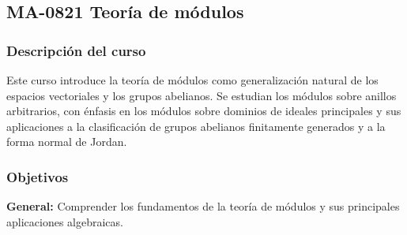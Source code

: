 \newpage
\subsection*{MA-0821 Teoría de módulos}

\hypertarget{MA0821}{}
\begin{refsection}
\begin{table}[H]
\end{table}

\subsubsection*{Descripción del curso}
Este curso introduce la teoría de módulos como generalización natural de los espacios vectoriales y los grupos abelianos. Se estudian los módulos sobre anillos arbitrarios, con énfasis en los módulos sobre dominios de ideales principales y sus aplicaciones a la clasificación de grupos abelianos finitamente generados y a la forma normal de Jordan. %




\subsubsection*{Objetivos}

\textbf{General:} Comprender los fundamentos de la teoría de módulos y sus principales aplicaciones algebraicas.


\end{refsection}

